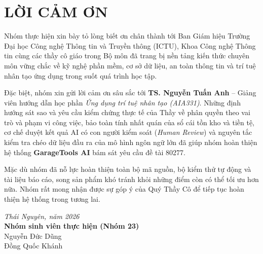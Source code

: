 \chapter*{LỜI CẢM ƠN}

Nhóm thực hiện xin bày tỏ lòng biết ơn chân thành tới Ban Giám hiệu Trường Đại học Công nghệ Thông tin và Truyền thông (ICTU), Khoa Công nghệ Thông tin cùng các thầy cô giáo trong Bộ môn đã trang bị nền tảng kiến thức chuyên môn vững chắc về kỹ nghệ phần mềm, cơ sở dữ liệu, an toàn thông tin và trí tuệ nhân tạo ứng dụng trong suốt quá trình học tập.

Đặc biệt, nhóm xin gửi lời cảm ơn sâu sắc tới \textbf{TS. Nguyễn Tuấn Anh} -- Giảng viên hướng dẫn học phần \textit{Ứng dụng trí tuệ nhân tạo (AIA331)}. Những định hướng sát sao và yêu cầu kiểm chứng thực tế của Thầy về phân quyền theo vai trò và phạm vi công việc, bảo toàn tính nhất quán của sổ cái tồn kho và tiền tệ, cơ chế duyệt kết quả AI có con người kiểm soát (\textit{Human Review}) và nguyên tắc kiểm tra chéo dữ liệu đầu ra của mô hình ngôn ngữ lớn đã giúp nhóm hoàn thiện hệ thống \textbf{GarageTools AI} bám sát yêu cầu đề tài 80277.

Mặc dù nhóm đã nỗ lực hoàn thiện toàn bộ mã nguồn, bộ kiểm thử tự động và tài liệu báo cáo, song sản phẩm khó tránh khỏi những điểm còn có thể tối ưu hơn nữa. Nhóm rất mong nhận được sự góp ý của Quý Thầy Cô để tiếp tục hoàn thiện hệ thống trong tương lai.

\vspace{1.0cm}
\begin{flushright}
\textit{Thái Nguyên, năm 2026}\\
\textbf{Nhóm sinh viên thực hiện (Nhóm 23)}\\
Nguyễn Đức Dũng\\
Đồng Quốc Khánh
\end{flushright}

